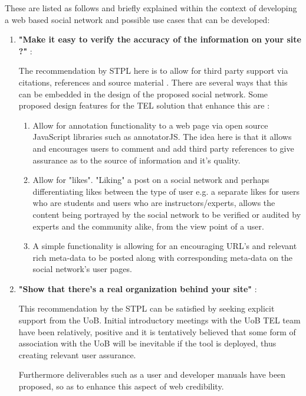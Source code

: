 These are listed as follows and briefly explained within the context of developing a web based social network and possible use cases that can be developed:

\begin{enumerate}
    \item \textbf{"Make it easy to verify the accuracy of the information on your site ?"} \cite{Fogg2002a}:
    
    The recommendation by STPL here is to allow for third party support via citations, references and source material \cite{Fogg2002a}. There are several ways that this can be embedded in the design of the proposed social network. Some proposed design features for the TEL solution that enhance this are :
    \begin{enumerate}
        
        \item Allow for annotation functionality to a web page via open source JavaScript libraries such as annotatorJS. The idea here is that it allows and encourages users to comment and add third party references to give assurance as to the source of information and it's quality.
        \item Allow for "likes". "Liking" a post on a social network and perhaps differentiating likes between the type of user e.g. a separate likes for users who are students and users who are instructors/experts, allows the content being portrayed by the social network to be verified or audited by experts and the community alike, from the view point of a user.
        \item A simple functionality is allowing for an encouraging URL's and relevant rich meta-data to be posted along with corresponding meta-data on the social network's user pages.
    
    \end{enumerate}
    
    \newpage
    \item \textbf{"Show that there's a real organization behind your site"} \cite{Fogg2002a}:
    
    This recommendation by the STPL can be satisfied by seeking explicit support from the UoB.  Initial introductory meetings with the UoB TEL team have been relatively, positive and it is tentatively believed that some form of association with the UoB will be inevitable if the tool is deployed, thus creating relevant user assurance.
    
    Furthermore deliverables such as a user and developer manuals have been proposed, so as to enhance this aspect of web credibility.
            

\end{enumerate}

